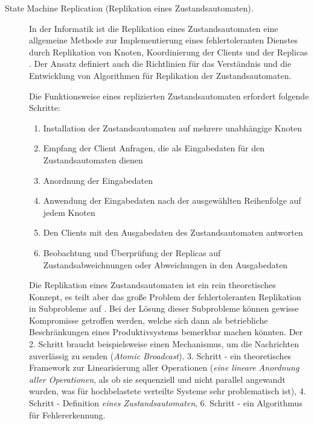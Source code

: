 \begin{description} 
	\item[State Machine Replication (Replikation eines Zustandsautomaten).] In der Informatik ist die Replikation eines Zustandsautomaten eine allgemeine Methode zur Implementierung eines fehlertoleranten Dienstes durch Replikation von Knoten, Koordinierung der Clients und der Replicas \cite{Schneider90implementingfault-tolerant}. Der Ansatz definiert auch die Richtlinien für das Verständnis und die Entwicklung von Algorithmen für Replikation der Zustandsautomaten.
	
	Die Funktionsweise eines replizierten Zustandsautomaten erfordert folgende Schritte:
	
	\begin{enumerate}
		\item Installation der Zustandsautomaten auf mehrere unabhängige Knoten
		
		\item Empfang der Client Anfragen, die als Eingabedaten für den Zustandsautomaten dienen
		
		\item Anordnung der Eingabedaten
		
		\item Anwendung der Eingabedaten nach der ausgewählten Reihenfolge auf jedem Knoten
		
		\item Den Clients mit den Ausgabedaten des Zustandsautomaten antworten
		
		\item Beobachtung und Überprüfung der Replicas auf Zustandsabweichnungen oder Abweichungen in den Ausgabedaten
	\end{enumerate}

	Die Replikation eines Zustandsautomaten ist ein rein theoretisches Konzept, es teilt aber das große Problem der fehlertoleranten Replikation in Subprobleme auf \cite{Schneider90implementingfault-tolerant}. Bei der Lösung dieser Subprobleme können gewisse Kompromisse getroffen werden, welche sich dann als betriebliche Beschränkungen eines Produktivsystems bemerkbar machen könnten. Der 2. Schritt braucht beispielsweise einen Mechanismus, um die Nachrichten zuverlässig zu senden (\textit{Atomic Broadcast}). 3. Schritt - ein theoretisches Framework zur Linearisierung aller Operationen (\textit{eine lineare Anordnung aller Operationen}, als ob sie sequenziell und nicht parallel angewandt wurden, was für hochbelastete verteilte Systeme sehr problematisch ist), 4. Schritt - Definition \textit{eines Zustandsautomaten}, 6. Schritt - ein Algorithmus für Fehlererkennung.
	

\end{description}
